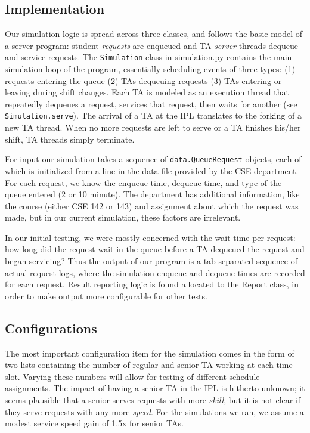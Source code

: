 \documentclass{article}
\begin{document}
\begin{multicols}{2}
\subsection*{Implementation}

Our simulation logic is spread across three classes, and follows the basic model of a server program: student \textit{requests} are enqueued and TA \textit{server} threads dequeue and service requests. The \texttt{Simulation} class in {simulation.py} contains the main simulation loop of the program, essentially scheduling events of three types: (1) requests entering the queue (2) TAs dequeuing requests (3) TAs entering or leaving during shift changes. Each TA is modeled as an execution thread that repeatedly dequeues a request, services that request, then waits for another (see \texttt{Simulation.serve}). The arrival of a TA at the IPL translates to the forking of a new TA thread. When no more requests are left to serve or a TA finishes his/her shift, TA threads simply terminate.

For input our simulation takes a sequence of \texttt{data.QueueRequest} objects, each of which is initialized from a line in the data file provided by the CSE department. For each request, we know the enqueue time, dequeue time, and type of the queue entered (2 or 10 minute). The department has additional information, like the course (either CSE 142 or 143) and assignment about which the request was made, but in our current simulation, these factors are irrelevant.

In our initial testing, we were mostly concerned with the wait time per request: how long did the request wait in the queue before a TA dequeued the request and began servicing? Thus the output of our program is a tab-separated sequence of actual request logs, where the simulation enqueue and dequeue times are recorded for each request. Result reporting logic is found allocated to the {Report} class, in order to make output more configurable for other tests.

\subsection*{Configurations}

The most important configuration item for the simulation comes in the form of two lists containing the number of regular and senior TA working at each time slot. Varying these numbers will allow for testing of different schedule assignments. The impact of having a senior TA in the IPL is hitherto unknown; it seems plausible that a senior serves requests with more \textit{skill}, but it is not clear if they serve requests with any more \textit{speed}. For the simulations we ran, we assume a modest service speed gain of 1.5x for senior TAs.


\end{multicols}
\end{document}
